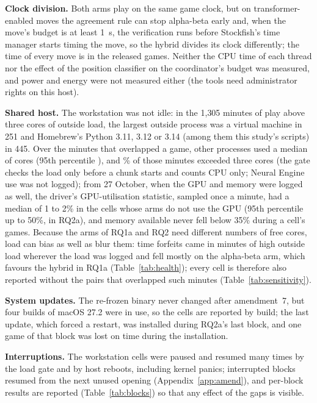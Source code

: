 \documentclass{article}
\begin{document}
\textbf{Clock division.} Both arms play on the same game clock, but on transformer-enabled moves the agreement rule can stop alpha-beta early and, when the move's budget is at least 1~s, the verification runs before Stockfish's time manager starts timing the move, so the hybrid divides its clock differently; the time of every move is in the released games. Neither the CPU time of each thread nor the effect of the position classifier on the coordinator's budget was measured, and power and energy were not measured either (the tools need administrator rights on this host).

\textbf{Shared host.} The workstation was not idle: in the 1{,}305 minutes of play above three cores of outside load, the largest outside process was a virtual machine in 251 and Homebrew's Python 3.11, 3.12 or 3.14 (among them this study's scripts) in 445. Over the \HostGameSamples{} minutes that overlapped a game, other processes used a median of \HostGameMedianCores{} cores (95th percentile \HostGamePninetyfiveCores{}), and \HostGameOverPct\% of those minutes exceeded three cores (the gate checks the load only before a chunk starts and counts CPU only; Neural Engine use was not logged); from 27 October, when the GPU and memory were logged as well, the driver's GPU-utilisation statistic, sampled once a minute, had a median of 1 to 2\% in the cells whose arms do not use the GPU (95th percentile up to 50\%, in RQ2a), and memory available never fell below 35\% during a cell's games. Because the arms of RQ1a and RQ2 need different numbers of free cores, load can bias as well as blur them: time forfeits came in minutes of high outside load wherever the load was logged and fell mostly on the alpha-beta arm, which favours the hybrid in RQ1a (Table~\ref{tab:health}); every cell is therefore also reported without the pairs that overlapped such minutes (Table~\ref{tab:sensitivity}).

\textbf{System updates.} The re-frozen binary never changed after amendment~7, but four builds of macOS 27.2 were in use, so the cells are reported by build; the last update, which forced a restart, was installed during RQ2a's last block, and one game of that block was lost on time during the installation.

\textbf{Interruptions.} The workstation cells were paused and resumed many times by the load gate and by host reboots, including kernel panics; interrupted blocks resumed from the next unused opening (Appendix~\ref{app:amend}), and per-block results are reported (Table~\ref{tab:blocks}) so that any effect of the gaps is visible.
\end{document}
